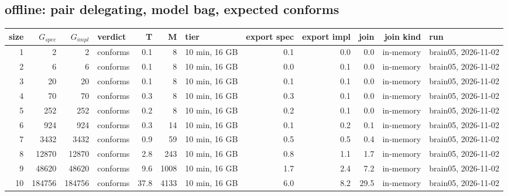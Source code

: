 \documentclass[10pt]{article}
\begin{document}
\subsection*{offline: pair \textsf{delegating}, model bag, expected conforms}
\begin{longtable}{@{}rrrlrrlrrrrl@{}}
\toprule
size & $G_{\mathit{spec}}$ & $G_{\mathit{impl}}$ & verdict & T & M & tier & export spec & export impl & join & join kind & run \\
\midrule
\endhead
\color{red} 1 & 2 & 2 & conforms & 0.1 & 8 & 10 min, 16 GB & 0.1 & 0.0 & 0.0 & in-memory & brain05, 2026-11-02 \\
\color{red} 2 & 6 & 6 & conforms & 0.1 & 8 & 10 min, 16 GB & 0.0 & 0.1 & 0.0 & in-memory & brain05, 2026-11-02 \\
\color{red} 3 & 20 & 20 & conforms & 0.1 & 8 & 10 min, 16 GB & 0.1 & 0.1 & 0.0 & in-memory & brain05, 2026-11-02 \\
\color{red} 4 & 70 & 70 & conforms & 0.3 & 8 & 10 min, 16 GB & 0.3 & 0.1 & 0.0 & in-memory & brain05, 2026-11-02 \\
\color{red} 5 & 252 & 252 & conforms & 0.2 & 8 & 10 min, 16 GB & 0.2 & 0.1 & 0.0 & in-memory & brain05, 2026-11-02 \\
\color{red} 6 & 924 & 924 & conforms & 0.3 & 14 & 10 min, 16 GB & 0.1 & 0.2 & 0.1 & in-memory & brain05, 2026-11-02 \\
\color{red} 7 & 3432 & 3432 & conforms & 0.9 & 59 & 10 min, 16 GB & 0.5 & 0.5 & 0.4 & in-memory & brain05, 2026-11-02 \\
\color{red} 8 & 12870 & 12870 & conforms & 2.8 & 243 & 10 min, 16 GB & 0.8 & 1.1 & 1.7 & in-memory & brain05, 2026-11-02 \\
\color{red} 9 & 48620 & 48620 & conforms & 9.6 & 1008 & 10 min, 16 GB & 1.7 & 2.4 & 7.2 & in-memory & brain05, 2026-11-02 \\
\color{red} 10 & 184756 & 184756 & conforms & 37.8 & 4133 & 10 min, 16 GB & 6.0 & 8.2 & 29.5 & in-memory & brain05, 2026-11-02 \\
\bottomrule
\end{longtable}
\end{document}
